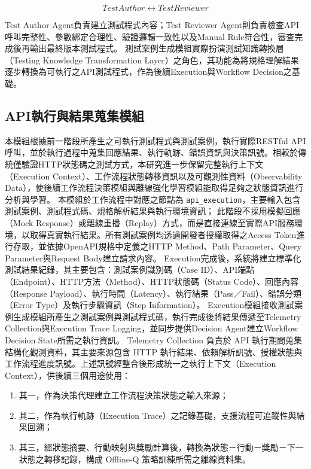 \begin{ZhChapter}
\begin{equation}
TestAuthor
\leftrightarrow
TestReviewer
\end{equation}

\text Test Author Agent負責建立測試程式內容；Test Reviewer Agent則負責檢查API呼叫完整性、參數綁定合理性、驗證邏輯一致性以及Manual Rule符合性，審查完成後再輸出最終版本測試程式。
\text 測試案例生成模組實際扮演測試知識轉換層（Testing Knowledge Transformation Layer）之角色，其功能為將規格理解結果逐步轉換為可執行之API測試程式，作為後續Execution與Workflow Decision之基礎。

\subsection{API執行與結果蒐集模組}
\text 本模組根據前一階段所產生之可執行測試程式與測試案例，執行實際RESTful API呼叫，並於執行過程中蒐集回應結果、執行軌跡、錯誤資訊與決策訊號。相較於傳統僅驗證HTTP狀態碼之測試方式，本研究進一步保留完整執行上下文（Execution Context）、工作流程狀態轉移資訊以及可觀測性資料（Observability Data），使後續工作流程決策模組與離線強化學習模組能取得足夠之狀態資訊進行分析與學習。
\text 本模組於工作流程中對應之節點為 \texttt{api\_execution}，主要輸入包含測試案例、測試程式碼、規格解析結果與執行環境資訊；
\text 此階段不採用模擬回應（Mock Response）或離線重播（Replay）方式，而是直接連線至實際API服務環境，以取得真實執行結果。所有測試案例均透過開發者授權取得之Access Token進行存取，並依據OpenAPI規格中定義之HTTP Method、Path Parameter、Query Parameter與Request Body建立請求內容。
\text Execution完成後，系統將建立標準化測試結果紀錄，其主要包含：測試案例識別碼（Case ID）、API端點（Endpoint）、HTTP方法（Method）、HTTP狀態碼（Status Code）、回應內容（Response Payload）、執行時間（Latency）、執行結果（Pass／Fail）、錯誤分類（Error Type）及執行步驟資訊（Step Information）。
\text Execution模組接收測試案例生成模組所產生之測試案例與測試程式碼，執行完成後將結果傳遞至Telemetry Collection與Execution Trace Logging，並同步提供Decision Agent建立Workflow Decision State所需之執行資訊。
\text Telemetry Collection 負責於 API 執行期間蒐集結構化觀測資料，其主要來源包含 HTTP 執行結果、依賴解析訊號、授權狀態與工作流程進度訊號。上述訊號經整合後形成統一之執行上下文（Execution Context），供後續三個用途使用：
\begin{enumerate}
  \item 其一，作為決策代理建立工作流程決策狀態之輸入來源；
  \item 其二，作為執行軌跡（Execution Trace）之記錄基礎，支援流程可追蹤性與結果回溯；
  \item 其三，經狀態摘要、行動映射與獎勵計算後，轉換為狀態－行動－獎勵－下一狀態之轉移記錄，構成 Offline-Q 策略訓練所需之離線資料集。

\end{enumerate}
\end{ZhChapter}
